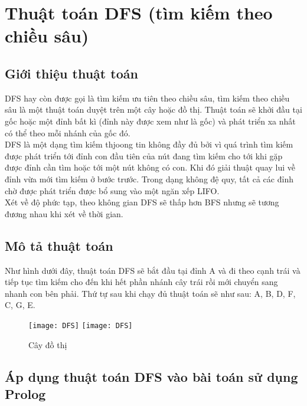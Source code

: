 \chapter{Thuật toán DFS (tìm kiếm theo chiều sâu)}
\ifpdf
    \graphicspath{{Chapter3/Chapter3Figs/PNG/}{Chapter3/Chapter3Figs/PDF/}{Chapter3/Chapter3Figs/}}
\else
    \graphicspath{{Chapter3/Chapter3Figs/EPS/}{Chapter3/Chapter3Figs/}}
\fi


\section{Giới thiệu thuật toán}
DFS hay còn được gọi là tìm kiếm ưu tiên theo chiều sâu, tìm kiếm theo chiều sâu là một thuật toán duyệt trên một cây hoặc đồ thị. Thuật toán sẽ khởi đầu tại gốc hoặc một đỉnh bất kì (đỉnh này được xem như là gốc) và phát triển xa nhất có thể theo mỗi nhánh của gốc đó.\\
DFS là một dạng tìm kiếm thjoong tin không đầy đủ bởi vì quá trình tìm kiếm được phát triển tới đỉnh con đầu tiên của nút đang tìm kiếm cho tới khi gặp được đỉnh cần tìm hoặc tới một nút không có con. Khi đó giải thuật quay lui về đỉnh vừa mới tìm kiếm ở bước trước. Trong dạng không đệ quy, tất cả các đỉnh chờ được phát triển được bổ sung vào một ngăn xếp LIFO.
\\ Xét về độ phức tạp, theo không gian DFS sẽ thấp hơn BFS nhưng sẽ tương đương nhau khi xét về thời gian.
\section{Mô tả thuật toán}
Như hình dưới đây, thuật toán DFS sẽ bắt đầu tại đỉnh A và đi theo cạnh trái và tiếp tục tìm kiếm cho đến khi hết phần nhánh cây trái rồi mới chuyển sang nhanh con bên phải. Thứ tự sau khi chạy đủ thuật toán sẽ như sau: A, B, D, F,  C, G, E.\\

\begin{figure}[!htbp]
  \begin{center}
    \leavevmode
    \ifpdf
      \texttt{[image: DFS]}
    \else
      \texttt{[image: DFS]}
    \fi
    \caption{Cây đồ thị}
    \label{FigAir}
  \end{center}
\end{figure}


\section{Áp dụng thuật toán DFS vào bài toán sử dụng Prolog}
